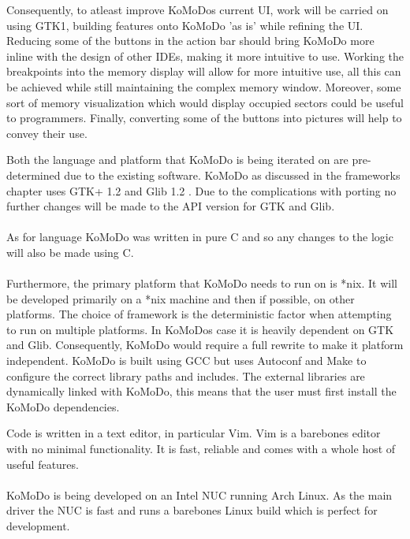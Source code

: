     Consequently, to atleast improve KoMoDos current UI, work will be carried on using GTK1, building features onto KoMoDo 'as is' while refining the UI. Reducing some of the buttons in the action bar should bring KoMoDo more inline with the design of other IDEs, making it more intuitive to use. Working the breakpoints into the memory display will allow for more intuitive use, all this can be achieved while still maintaining the complex memory window. Moreover, some sort of memory visualization which would display occupied sectors could be useful to programmers. Finally, converting some of the buttons into pictures will help to convey their use.

  Both the language and platform that KoMoDo is being iterated on are pre-determined due to the existing software. KoMoDo as discussed in the frameworks chapter uses GTK+ 1.2 and Glib 1.2 . Due to the complications with porting no further changes will be made to the API version for GTK and Glib.\\\\
  As for language KoMoDo was written in pure C and so any changes to the logic will also be made using C.\\\\
  Furthermore, the primary platform that KoMoDo needs to run on is *nix. It will be developed primarily on a *nix machine and then if possible, on other platforms. The choice of framework is the deterministic factor when attempting to run on multiple platforms. In KoMoDos case it is heavily dependent on GTK and Glib. Consequently, KoMoDo would require a full rewrite to make it platform independent.
  KoMoDo is built using GCC but uses Autoconf and Make to configure the correct library paths and includes. The external libraries are dynamically linked with KoMoDo, this means that the user must first install the KoMoDo dependencies.

  Code is written in a text editor, in particular Vim. Vim is a barebones editor with no minimal functionality. It is fast, reliable and comes with a whole host of useful features.\\\\
  KoMoDo is being developed on an Intel NUC running Arch Linux. As the main driver the NUC is fast and runs a barebones Linux build which is perfect for development.

